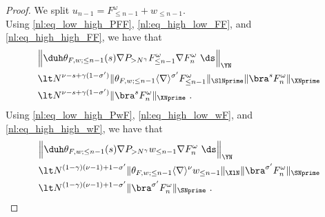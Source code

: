 \documentclass[11pt]{article}
\begin{document}
\begin{proof}
We split \( u_{n-1} =  F_{\leq n-1}^\omega + w_{\leq n-1} \). \\
Using \eqref{nl:eq_low_high_PFF}, \eqref{nl:eq_high_low_FF}, and \eqref{nl:eq_high_high_FF}, we have that 
\begin{align*}
&\Big \| \duh \theta_{F,w;\leq n-1}(s) \nabla P_{>N^\gamma} F_{\leq n-1}^\omega \nabla F_n^\omega ~ \ds \Big \|_{\YN} \\
&\lt N^{\nu-s+\gamma(1-\sigma^\prime)} \| \theta_{F,w;\leq n-1} \langle \nabla \rangle^{\sigma^\prime} F_{\leq n-1}^\omega \|_{\SlNprime} \| \bra^s F_n^\omega \|_{\XNprime} \\
&\lt N^{\nu-s+\gamma(1-\sigma^\prime)}\| \bra^s F_n^\omega \|_{\XNprime} ~. 
\end{align*}
Using \eqref{nl:eq_low_high_PwF}, \eqref{nl:eq_high_low_wF}, and \eqref{nl:eq_high_high_wF}, we have that 
\begin{align*}
&\Big \| \duh \theta_{F,w;\leq n-1}(s) \nabla P_{>N^\gamma} w_{\leq n-1} \nabla F_n^\omega ~ \ds \Big \|_{\YN} \\
&\lt N^{(1-\gamma)(\nu-1)+1-\sigma^\prime} \| \theta_{F,w;\leq n-1} \langle \nabla \rangle^{\nu} w_{\leq n-1} \|_{\XlN} \| \bra^{\sigma^\prime} F_n^\omega \|_{\SNprime} \\
&\lt N^{(1-\gamma)(\nu-1)+1-\sigma^\prime} \| \bra^{\sigma^\prime} F_n^\omega \|_{\SNprime} ~. 
\end{align*}
\end{proof}
\end{document}
